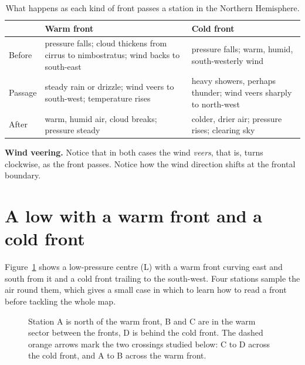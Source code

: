 \begin{table}[ht]
\centering
\caption{What happens as each kind of front passes a station in the Northern Hemisphere.}
\begin{tabular}{@{}p{3.1cm}p{5.8cm}p{5.8cm}@{}}
\toprule
 & \textbf{Warm front} & \textbf{Cold front}\\
\midrule
Before & pressure falls; cloud thickens from cirrus to nimbostratus; wind backs to south-east & pressure falls; warm, humid, south-westerly wind\\
Passage & steady rain or drizzle; wind veers to south-west; temperature rises & heavy showers, perhaps thunder; wind veers sharply to north-west\\
After & warm, humid air, cloud breaks; pressure steady & colder, drier air; pressure rises; clearing sky\\
\bottomrule
\end{tabular}
\end{table}

\textbf{Wind veering.} Notice that in both cases the wind \emph{veers}, that is, turns clockwise, as the front passes. Notice how the wind direction shifts at the frontal boundary.

\section{A low with a warm front and a cold front}\label{p3-sec:fig9}

Figure~\ref{p3-fig:fig9} shows a low-pressure centre (L) with a warm front curving east and south from it and a cold front trailing to the south-west. Four stations sample the air round them, which gives a small case in which to learn how to read a front before tackling the whole map.

\begin{figure}[ht]
\centering
{}
\caption{Station A is north of the warm front, B and C are in the warm sector between the fronts, D is behind the cold front. The dashed orange arrows mark the two crossings studied below: C to D across the cold front, and A to B across the warm front.}\label{p3-fig:fig9}
\end{figure}

